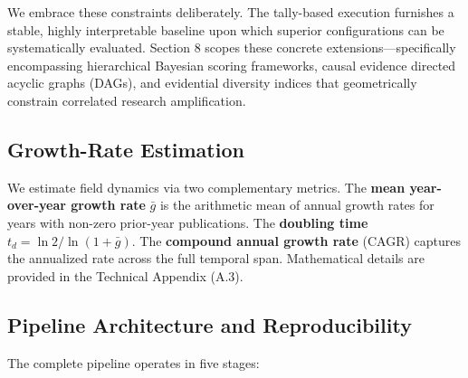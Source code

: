 \documentclass[
]{article}
\begin{document}
We embrace these constraints deliberately. The tally-based execution
furnishes a stable, highly interpretable baseline upon which superior
configurations can be systematically evaluated. Section 8 scopes these
concrete extensions---specifically encompassing hierarchical Bayesian
scoring frameworks, causal evidence directed acyclic graphs (DAGs), and
evidential diversity indices that geometrically constrain correlated
research amplification.

\subsection{Growth-Rate Estimation}\label{growth-rate-estimation}

We estimate field dynamics via two complementary metrics. The
\textbf{mean year-over-year growth rate} \(\bar{g}\) is the arithmetic
mean of annual growth rates for years with non-zero prior-year
publications. The \textbf{doubling time}
\(t_d = \ln 2 / \ln(1 + \bar{g})\). The \textbf{compound annual growth
rate} (CAGR) captures the annualized rate across the full temporal span.
Mathematical details are provided in the Technical Appendix (A.3).

\subsection{Pipeline Architecture and
Reproducibility}\label{pipeline-architecture-and-reproducibility}

The complete pipeline operates in five stages:
\end{document}
